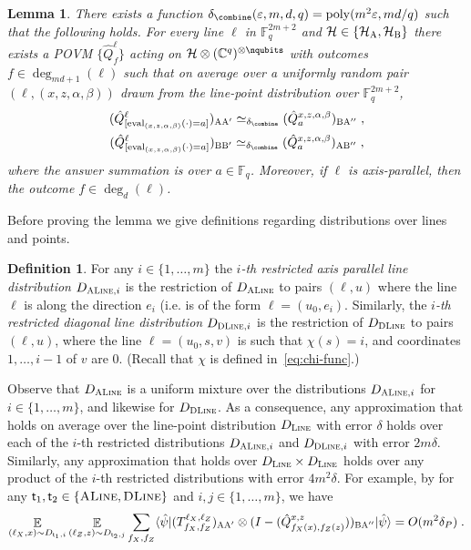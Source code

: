 \documentclass[11pt]{article}
\newtheorem{lemma}[theorem]{Lemma}
\theoremstyle{definition}
\newtheorem{definition}[theorem]{Definition}
\newcommand{\ket}[1]{|#1\rangle}
\newcommand{\bra}[1]{\langle#1|}
\newcommand{\C}{\ensuremath{\mathbb{C}}}
\newcommand{\F}{\ensuremath{\mathbb{F}}}
\newcommand{\ot}{\otimes}
\newcommand{\mH}{\ensuremath{\mathcal{H}}}
\DeclareMathOperator{\poly}{poly}
\newcommand{\eps}{\varepsilon}
\newcommand{\E}{\mathop{\mathbb{E}}\displaylimits}
\newcommand{\labelstyle}[1]{\ensuremath{\textsc{#1}}\xspace}
\newcommand{\tvarstyle}[1]{\mathsf{#1}}
\newcommand{\tvar}{\ensuremath{\tvarstyle{t}}}
\newcommand{\alice}{\labelstyle{A}}
\newcommand{\bob}{\labelstyle{B}}
\newcommand{\typestyle}[1]{\ensuremath{\textsc{#1}}\xspace}
\renewcommand{\line}{\mathbf{\ell}}
\newcommand{\Line}{\typestyle{Line}}
\newcommand{\ALine}{\typestyle{ALine}}
\newcommand{\DLine}{\typestyle{DLine}}
\newcommand{\eval}{\mathrm{eval}}
\begin{document}
\begin{lemma}\label{lem:qld-4-13}
There exists a function $\delta_{\combine}(\eps,m,d,q) = \poly(m^2\eps,md/q)$ such that the following holds. 
For every line $\line$ in
$\F_q^{2m + 2}$ and $\mH \in \{ \mH_\alice,\mH_\bob\}$ there exists a POVM $\{ \hat{Q}^\line_f \}$ acting on
$\mathcal{H} \otimes (\C^q)^{\otimes \nqubits}$ with outcomes $f\in
\deg_{md+1}(\line)$ such that on average over a uniformly random
pair $(\line, (x,z,\alpha, \beta))$ drawn from the line-point
distribution over $\F_q^{2m+2}$,
\begin{gather}
\label{eq:qld-4-13}
(\hat{Q}^\line_{[\eval_{(x,z,\alpha,\beta)}(\cdot) = a]})_{\alice \alice'} \simeq_{\delta_{\combine}} (\hat{Q}^{x,z,\alpha,\beta}_{a} )_{\bob \alice''}\;, \\
(\hat{Q}^\line_{[\eval_{(x,z,\alpha,\beta)}(\cdot) = a]})_{\bob \bob'} \simeq_{\delta_{\combine}} ( \hat{Q}^{x,z,\alpha,\beta}_{a} )_{\alice \bob''}\;,
\end{gather}
where the answer summation is over $a \in \F_q$. Moreover, if $\line$ is axis-parallel, then the outcome $f \in \deg_{d}(\line)$.
\end{lemma}

Before proving the lemma we give definitions regarding distributions over lines and points.

\begin{definition}\label{def:ith-restricted-line}
  For any $i \in \{1, \dots,
  m\}$ the \emph{$i$-th restricted axis parallel line distribution $D_{\ALine,
    i}$} is the restriction of $D_{\ALine}$ to pairs  $(\line, u)$
  where the line $\line$ is along the direction $e_i$ (i.e. is of the
  form $\line = (u_0, e_i)$. Similarly, the \emph{$i$-th restricted
  diagonal line distribution $D_{\DLine, i}$} is the restriction of
  $D_{\DLine}$ to pairs $(\line, u)$, where the line $\line = (u_0,
  s, v)$ is such that $\chi(s) = i$, and coordinates $1, \dots, i-1$ of
  $v$ are $0$. (Recall that $\chi$ is defined in~\eqref{eq:chi-func}.)
\end{definition}
  Observe that $D_{\ALine}$ is a uniform mixture over the
  distributions $D_{\ALine, i}$ for $i \in \{1, \dots, m\}$, and
  likewise for $D_{\DLine}$.
  As a consequence, any approximation that
  holds on average over the line-point distribution $D_{\Line}$ with
  error $\delta$ holds over each of the $i$-th restricted distributions
  $D_{\ALine, i}$ and $D_{\DLine, i}$ with error $2m\delta$. Similarly,
  any approximation that holds over $D_{\Line} \times D_{\Line}$ holds
  over any product of the $i$-th restricted distributions with error
  $4m^2 \delta$. For example, by  for any $\tvar_1, \tvar_2 \in \{\ALine, \DLine\}$ and $i, j \in \{1, \dots, m\}$, we have
  \begin{equation}
    \E_{(\line_X, x) \sim D_{\tvar_1, i}} \E_{(\line_Z, z) \sim D_{\tvar_2, j}} \sum_{f_X, f_Z} \bra{\hat{\psi}} (T^{\line_X, \line_Z}_{f_X, f_Z})_{\alice \alice'} \ot (I - (\hat{Q}^{x,z}_{f_X(x), f_Z(z)}))_{\bob \alice''} \ket{\hat{\psi}} = O(m^2 \delta_P)\;. \label{eq:qld-xz-lines-restricted}
    \end{equation}
\end{document}
